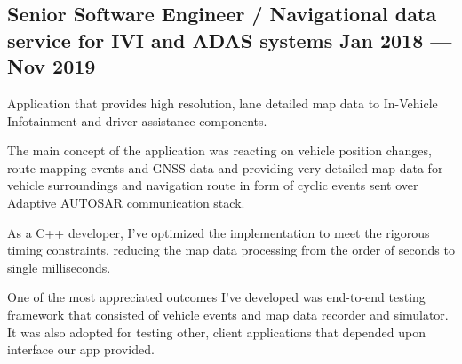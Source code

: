 \documentclass[letter,10pt]{article}
\begin{document}
\subsection{{Senior Software Engineer / Navigational data service for IVI and ADAS systems \hfill Jan 2018 --- Nov 2019}}
\begin{zitemize}
\item Application that provides high resolution, lane detailed map data to In-Vehicle Infotainment and driver assistance components.
\item The main concept of the application was reacting on vehicle position changes, route mapping events and GNSS data and providing very detailed map data for vehicle surroundings and navigation route in form of cyclic events sent over Adaptive AUTOSAR communication stack.
\item As a C++ developer, I've optimized the implementation to meet the rigorous timing constraints, reducing the map data processing from the order of seconds to single milliseconds.
\item One of the most appreciated outcomes I've developed was end-to-end testing framework that consisted of vehicle events and map data recorder and simulator. It was also adopted for testing other, client applications that depended upon interface our app provided.
\end{zitemize}
\end{document}
